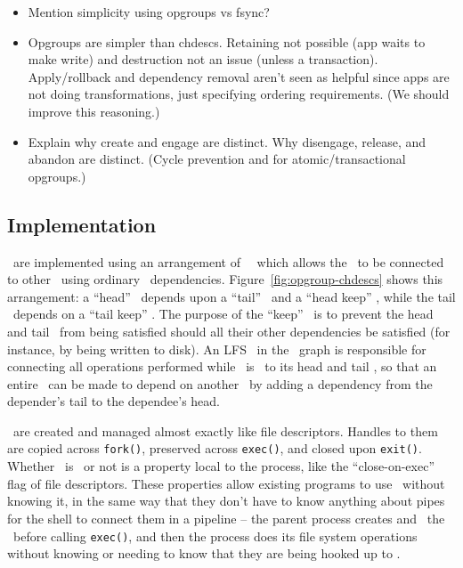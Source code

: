 \begin{itemize}
\item Mention simplicity using opgroups vs fsync?
\item Opgroups are simpler than chdescs. Retaining not possible (app
  waits to make write) and destruction not an issue (unless a
  transaction). Apply/rollback and dependency removal aren't seen as
  helpful since apps are not doing transformations, just specifying
  ordering requirements. (We should improve this reasoning.)
\item Explain why create and engage are distinct. Why disengage,
  release, and abandon are distinct. (Cycle prevention and for
  atomic/transactional opgroups.)
\end{itemize}

\subsection{Implementation}
\label{sec:opgroup:implementation}


\Opgroups\ are implemented using an arrangement of \noop\ \chdescs\ which allows
the \opgroup\ to be connected to other \opgroups\ using ordinary \chdesc\
dependencies.  Figure~\ref{fig:opgroup-chdescs} shows this arrangement: a
``head'' \chdesc\ depends upon a ``tail'' \chdesc\ and a ``head keep'' \chdesc,
while the tail \chdesc\ depends on a ``tail keep'' \chdesc. The purpose of the
``keep'' \chdescs\ is to prevent the head and tail \chdescs\ from being
satisfied should all their other dependencies be satisfied (for instance, by
being written to disk). An LFS \module\ in the \module\ graph is responsible for
connecting all operations performed while \anopgroup\ is \engaged\ to its head
and tail \chdescs, so that an entire \opgroup\ can be made to depend on another
\opgroup\ by adding a dependency from the depender's tail to the dependee's
head.

\Opgroups\ are created and managed almost exactly like file descriptors. Handles
to them are copied across \texttt{fork()}, preserved across \texttt{exec()}, and
closed upon \texttt{exit()}. Whether \anopgroup\ is \engaged\ or not is a
property local to the process, like the ``close-on-exec'' flag of file
descriptors. These properties allow existing programs to use \opgroups\ without
knowing it, in the same way that they don't have to know anything about pipes
for the shell to connect them in a pipeline -- the parent process creates and
\engages\ the \opgroups\ before calling \texttt{exec()}, and then the process
does its file system operations without knowing or needing to know that they are
being hooked up to \anopgroup.

